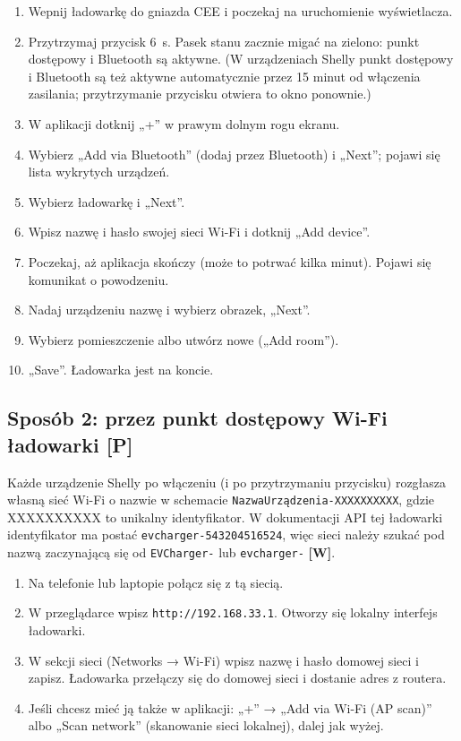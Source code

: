\documentclass[11pt,a4paper]{article}
\newcommand{\tagP}{\textcolor{apgreen}{\textbf{[P]}}}
\newcommand{\tagW}{\textcolor{apamber}{\textbf{[W]}}}
\newcommand{\code}[1]{\texttt{#1}}
\begin{document}
\begin{enumerate}
\item Wepnij ładowarkę do gniazda CEE i poczekaj na uruchomienie wyświetlacza.
\item Przytrzymaj przycisk 6~s. Pasek stanu zacznie migać na zielono: punkt dostępowy i Bluetooth są aktywne. (W urządzeniach Shelly punkt dostępowy i Bluetooth są też aktywne automatycznie przez 15 minut od włączenia zasilania; przytrzymanie przycisku otwiera to okno ponownie.)
\item W aplikacji dotknij „+” w prawym dolnym rogu ekranu.
\item Wybierz „Add via Bluetooth” (dodaj przez Bluetooth) i „Next”; pojawi się lista wykrytych urządzeń.
\item Wybierz ładowarkę i „Next”.
\item Wpisz nazwę i hasło swojej sieci Wi-Fi i dotknij „Add device”.
\item Poczekaj, aż aplikacja skończy (może to potrwać kilka minut). Pojawi się komunikat o powodzeniu.
\item Nadaj urządzeniu nazwę i wybierz obrazek, „Next”.
\item Wybierz pomieszczenie albo utwórz nowe („Add room”).
\item „Save”. Ładowarka jest na koncie.
\end{enumerate}

\subsection{Sposób 2: przez punkt dostępowy Wi-Fi ładowarki \tagP}

Każde urządzenie Shelly po włączeniu (i po przytrzymaniu przycisku) rozgłasza własną sieć Wi-Fi o nazwie w schemacie \code{NazwaUrządzenia-XXXXXXXXXX}, gdzie XXXXXXXXXX to unikalny identyfikator. W dokumentacji API tej ładowarki identyfikator ma postać \code{evcharger-543204516524}, więc sieci należy szukać pod nazwą zaczynającą się od \code{EVCharger-} lub \code{evcharger-} \tagW.

\begin{enumerate}
\item Na telefonie lub laptopie połącz się z tą siecią.
\item W przeglądarce wpisz \code{http://192.168.33.1}. Otworzy się lokalny interfejs ładowarki.
\item W sekcji sieci (Networks → Wi-Fi) wpisz nazwę i hasło domowej sieci i zapisz. Ładowarka przełączy się do domowej sieci i dostanie adres z routera.
\item Jeśli chcesz mieć ją także w aplikacji: „+” → „Add via Wi-Fi (AP scan)” albo „Scan network” (skanowanie sieci lokalnej), dalej jak wyżej.
\end{enumerate}
\end{document}
